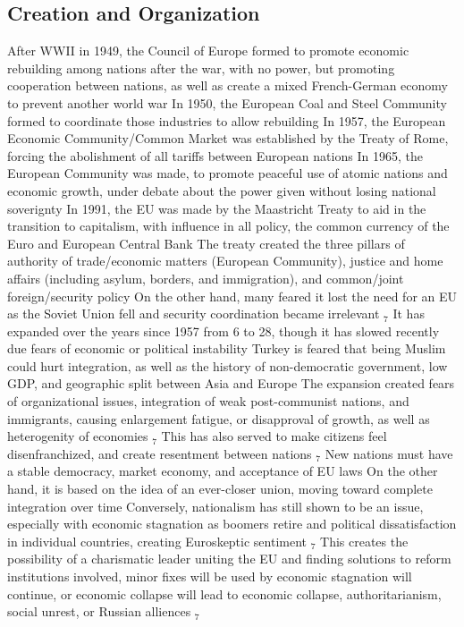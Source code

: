 \documentclass[11 pt, twoside]{article}
\newcommand{\foot}[1]{\hyperlink{#1}{$_#1$}}
\newenvironment{outline*}
{
	\begin{outline}[enumerate]
	}
	{\end{outline}
}
\begin{document}
\subsection{Creation and Organization}
\begin{outline*}
\1 After WWII in 1949, the Council of Europe formed to promote economic rebuilding among nations after the war, with no power, but promoting cooperation between nations, as well as create a mixed French-German economy to prevent another world war
\2 In 1950, the European Coal and Steel Community formed to coordinate those industries to allow rebuilding
\2 In 1957, the European Economic Community/Common Market was established by the Treaty of Rome, forcing the abolishment of all tariffs between European nations
\2 In 1965, the European Community was made, to promote peaceful use of atomic nations and economic growth, under debate about the power given without losing national soverignty
\1 In 1991, the EU was made by the Maastricht Treaty to aid in the transition to capitalism, with influence in all policy, the common currency of the Euro and European Central Bank
\2 The treaty created the three pillars of authority of trade/economic matters (European Community), justice and home affairs (including asylum, borders, and immigration), and common/joint foreign/security policy
\2 On the other hand, many feared it lost the need for an EU as the Soviet Union fell and security coordination became irrelevant \foot{7}
\1 It has expanded over the years since 1957 from 6 to 28, though it has slowed recently due fears of economic or political instability
\2 Turkey is feared that being Muslim could hurt integration, as well as the history of non-democratic government, low GDP, and geographic split between Asia and Europe
\2 The expansion created fears of organizational issues, integration of weak post-communist nations, and immigrants, causing enlargement fatigue, or disapproval of growth, as well as heterogenity of economies \foot{7}
\3 This has also served to make citizens feel disenfranchized, and create resentment between nations \foot{7}
\2 New nations must have a stable democracy, market economy, and acceptance of EU laws
\2 On the other hand, it is based on the idea of an ever-closer union, moving toward complete integration over time
\3 Conversely, nationalism has still shown to be an issue, especially with economic stagnation as boomers retire and political dissatisfaction in individual countries, creating Euroskeptic sentiment \foot{7}
\3 This creates the possibility of a charismatic leader uniting the EU and finding solutions to reform institutions involved, minor fixes will be used by economic stagnation will continue, or economic collapse will lead to economic collapse, authoritarianism, social unrest, or Russian alliences \foot{7}

\end{outline*}
\end{document}
